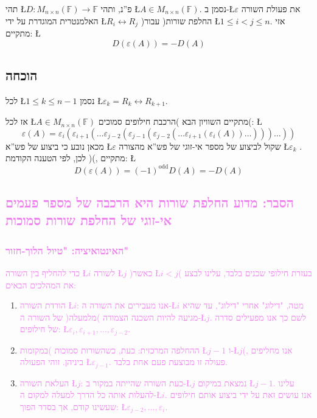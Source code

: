 \documentclass[english,hebrew]{article}
\begin{document}
תהי \L{$D\colon M_{n\times n}(\mathbb{F})\to\mathbb{F}$} פ\textquotedblright נ,
ותהי \L{$A\in M_{n\times n}(\mathbb{F})$}. נסמן ב-\L{$\varepsilon$}
את פעולת השורה האלמנטרית המוגדרת על ידי \L{$R_{i}\leftrightarrow R_{j}$}
)החלפת שורות( עבור \L{$1\le i<j\le n$}. אזי מתקיים: \L{%
\[
D(\varepsilon(A))=-D(A)
\]
}%

\subsection{הוכחה}

לכל \L{$1\le k\le n-1$} נסמן \L{$\varepsilon_{k}=R_{k}\leftrightarrow R_{k+1}$}. 

אז לכל \L{$A\in M_{n\times n}(\mathbb{F})$} מתקיים השוויון הבא )הרכבת
חילופים סמוכים(: \L{%
\[
\varepsilon(A)=\varepsilon_{i}(\varepsilon_{i+1}(\dots\varepsilon_{j-2}(\varepsilon_{j-1}(\varepsilon_{j-2}(\dots\varepsilon_{i+1}(\varepsilon_{i}(A))\dots)))\dots))
\]
}%
מכאן נובע כי ביצוע של פש\textquotedblright א \L{$\varepsilon$} שקול
לביצוע של מספר אי-זוגי של פש\textquotedblright א מהצורה \L{$\varepsilon_{k}$}
. לכן, לפי הטענה הקודמת ){\endL}(, מתקיים: \L{%
\[
D(\varepsilon(A))=(-1)^{\text{odd}}D(A)=-D(A)
\]
}%

\subsection{\textcolor{violet}{הסבר: מדוע החלפת שורות היא הרכבה של מספר פעמים
אי-זוגי של החלפת שורות סמוכות}}

\subsubsection{\textcolor{violet}{האינטואיציה: "טיול הלוך-חזור"}}

\textcolor{violet}{כדי להחליף בין השורה \L{$i$} לשורה \L{$j$} )כאשר
\L{$i<j$}( בעזרת חילופי שכנים בלבד, עלינו לבצע את המהלכים הבאים: }
\begin{enumerate}
\item \textcolor{violet}{הורדת השורה \L{$i$}: אנו מעבירים את השורה ה-\L{$i$}
מטה, "דילוג" אחרי "דילוג", עד שהיא מגיעה להיות השכנה הצמודה )מלמעלה(
של השורה ה-\L{$j$}. לשם כך אנו מפעילים סדרה של חילופים: \L{$\varepsilon_{i},\varepsilon_{i+1},\dots,\varepsilon_{j-2}$}. }
\item \textcolor{violet}{ההחלפה המרכזית: כעת, כשהשורות סמוכות )במקומות \L{$j-1$}
ו-\L{$j$}(, אנו מחליפים ביניהן. זוהי הפעולה \L{$\varepsilon_{j-1}$}.
פעולה זו מבוצעת פעם אחת בלבד. }
\item \textcolor{violet}{העלאת השורה \L{$j$}: כעת השורה שהייתה במקור ב-\L{$j$}
נמצאת במיקום \L{$j-1$}. עלינו להעלות אותה כל הדרך למעלה למקום ה-\L{$i$}.
אנו עושים זאת על ידי ביצוע אותם חילופים שעשינו קודם, אך בסדר הפוך:
\L{$\varepsilon_{j-2},\dots,\varepsilon_{i}$}. }
\end{enumerate}
\end{document}

